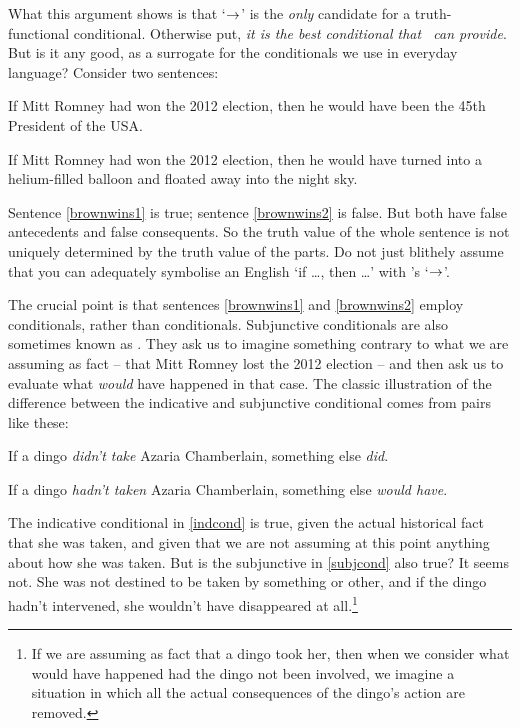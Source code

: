 What this argument shows is that `$\rightarrow$' is the \emph{only} candidate for a truth-functional conditional. Otherwise put, \emph{it is the best conditional that \TFL\ can provide}. But is it any good, as a surrogate for the conditionals we use in everyday language? Consider two sentences:
	\begin{earg}
		\item[\ex{brownwins1}] If Mitt Romney had won the 2012 election, then he would have been the 45th President of the USA.
		\item[\ex{brownwins2}] If Mitt Romney had won the 2012 election, then he would have turned into a helium-filled balloon and floated away into the night sky.
	\end{earg}
Sentence \ref{brownwins1} is true; sentence \ref{brownwins2} is false. But both have false antecedents and false consequents. So the truth value of the whole sentence is not uniquely determined by the truth value of the parts. Do not just blithely assume that you can adequately symbolise an English `if …, then …' with \TFL's `$\rightarrow$'. 

The crucial point is that sentences \ref{brownwins1} and \ref{brownwins2} employ  conditionals, rather than  conditionals. Subjunctive conditionals are also sometimes known as . They ask us to imagine something contrary to what we are assuming as fact – that Mitt Romney lost the 2012 election – and then ask us to evaluate what \emph{would} have happened in that case. The classic illustration of the difference between the indicative and subjunctive conditional comes from pairs like these:
\begin{earg}
	\item[\ex{indcond}] If a dingo \emph{didn't take} Azaria Chamberlain, something else \emph{did}.
	\item[\ex{subjcond}] If a dingo \emph{hadn't taken} Azaria Chamberlain, something else \emph{would have}.
\end{earg} The indicative conditional in \ref{indcond} is true, given the actual historical fact that she was taken, and given that we are not assuming at this point anything about how she was taken. But is the subjunctive in \ref{subjcond} also true? It seems not. She was not destined to be taken by something or other, and if the dingo hadn't intervened, she wouldn't have disappeared at all.\footnote{If we are assuming as fact that a dingo took her, then when we consider what would have happened had the dingo not been involved, we imagine a situation in which all the actual consequences of the dingo's action are removed.}

